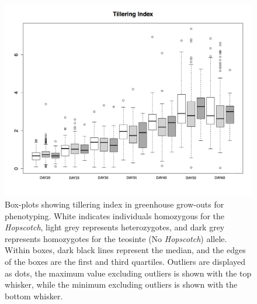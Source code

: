 \documentclass[11pt]{article} %
\begin{document}
\begin{linenumbers}
\begin{flushleft}
\begin{figure}[!t]
  \begin{center}
   \includegraphics[width=160mm]{Figure4BoxplotPheno1.png}
   \end{center}
    \caption{Box-plots showing tillering index in greenhouse grow-outs for phenotyping. White indicates individuals homozygous for the \emph{Hopscotch}, light grey represents heterozygotes, and dark grey represents homozygotes for the teosinte (No \emph{Hopscotch}) allele. Within boxes, dark black lines represent the median, and the edges of the boxes are the first and third quartiles. Outliers are displayed as dots, the maximum value excluding outliers is shown with the top whisker, while the minimum excluding outliers is shown with the bottom whisker.}
\label{Fig4Boxplots}
\end{figure}


\end{flushleft}

\end{linenumbers}
\end{document}
